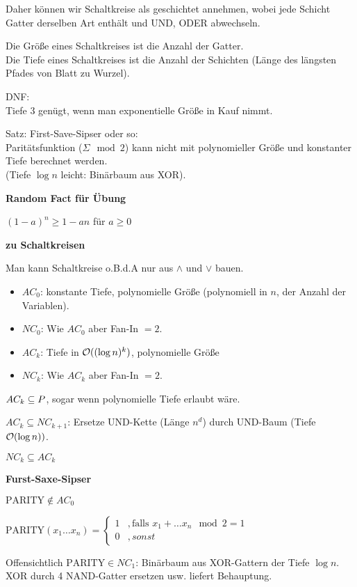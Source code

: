 Daher können wir Schaltkreise als geschichtet annehmen, wobei jede Schicht
Gatter derselben Art enthält und UND, ODER abwechseln.

Die Größe eines Schaltkreises ist die Anzahl der Gatter.
\\
Die Tiefe eines Schaltkreises ist die Anzahl der Schichten
(Länge des längsten Pfades von Blatt zu Wurzel).


DNF:\\
Tiefe 3 genügt, wenn man exponentielle Größe in Kauf nimmt.


Satz: First-Save-Sipser oder so:\\
Paritätsfunktion ($\Sigma \mod 2$) kann nicht mit polynomieller Größe und
konstanter Tiefe berechnet werden.
\\
(Tiefe $\log n$ leicht: Binärbaum aus XOR).
















\textbf{Random Fact für Übung}

$(1-a)^n \geq 1 - an$ für $a \geq 0$



\textbf{zu Schaltkreisen}

Man kann Schaltkreise o.B.d.A nur aus $\land$ und $\lor$ bauen.

\begin{itemize}
    \item
        $AC_0$: konstante Tiefe, polynomielle Größe (polynomiell in $n$, der Anzahl der Variablen).
    \item
        $NC_0$: Wie $AC_0$ aber Fan-In $= 2$.
    \item
        $AC_k$: Tiefe in $\mathcal{O}((\log n)^k)$, polynomielle Größe
    \item
        $NC_k$: Wie $AC_k$ aber Fan-In $= 2$.
\end{itemize}

$AC_k \subseteq P$, sogar wenn polynomielle Tiefe erlaubt wäre.

$AC_k \subseteq NC_{k+1}$: Ersetze UND-Kette (Länge $n^d$) durch UND-Baum (Tiefe $\mathcal{O}(\log n))$.

$NC_k \subseteq AC_k$



\begin{satz}
    \textbf{Furst-Saxe-Sipser}

    $\text{PARITY} \notin AC_0$

    $\text{PARITY}(x_1 \dots x_n) =
    \begin{cases}
        1   & , \text{falls } x_1 + \dots x_n \mod 2 = 1 \\
        0   & , sonst
    \end{cases}
    $

    Offensichtlich $\text{PARITY} \in NC_1$:
    Binärbaum aus XOR-Gattern der Tiefe $\log n$.
    XOR durch 4 NAND-Gatter ersetzen usw. liefert Behauptung.


\end{satz}

